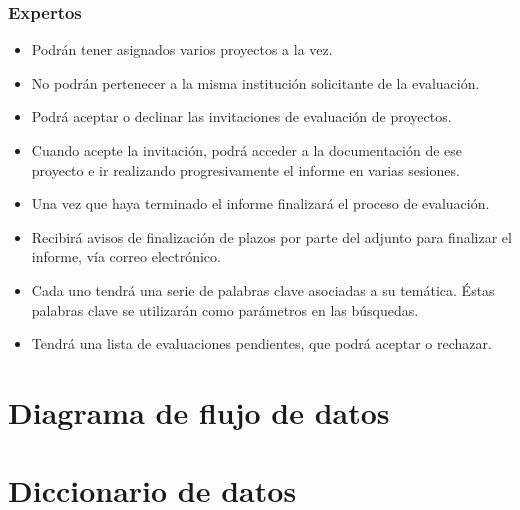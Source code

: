 \documentclass[12pt,a4paper,spanish,twoside]{book}
\begin{document}
\subsection{Expertos}
\begin{itemize}
\item Podrán tener asignados varios proyectos a la vez. 
\item No podrán pertenecer a la misma institución solicitante de la evaluación.
\item Podrá aceptar o declinar las invitaciones de evaluación de proyectos.
\item Cuando acepte la invitación, podrá acceder a la documentación de ese
  proyecto e ir realizando progresivamente el informe en varias sesiones. 
\item Una vez que haya terminado el informe finalizará el proceso de 
  evaluación.
\item Recibirá avisos de finalización de plazos por parte del adjunto para
  finalizar el informe, vía correo electrónico.
\item Cada uno tendrá una serie de palabras clave asociadas a su
  temática. Éstas palabras clave se utilizarán como parámetros en las
  búsquedas. 
\item Tendrá una lista de evaluaciones pendientes, que podrá aceptar o 
  rechazar.
\end{itemize}

\chapter{Diagrama de flujo de datos}









\chapter{Diccionario de datos}
\end{document}
